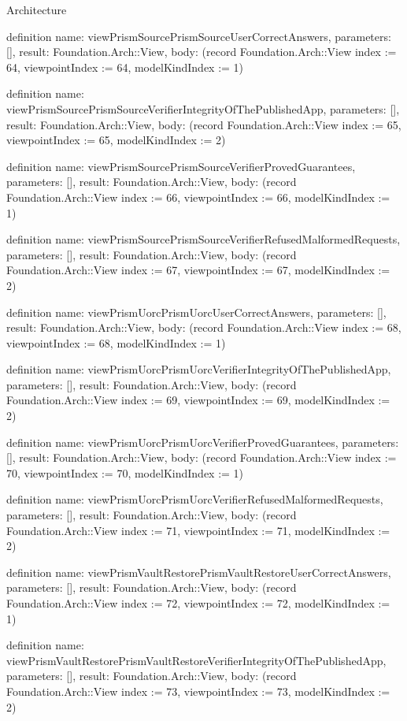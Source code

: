 \begin{lexlean}{Architecture}
\begin{semanticmodule}
definition{
  name: viewPrismSourcePrismSourceUserCorrectAnswers,
  parameters: [],
  result: Foundation.Arch::View,
  body: (record Foundation.Arch::View {index := 64, viewpointIndex := 64, modelKindIndex := 1})
}

definition{
  name: viewPrismSourcePrismSourceVerifierIntegrityOfThePublishedApp,
  parameters: [],
  result: Foundation.Arch::View,
  body: (record Foundation.Arch::View {index := 65, viewpointIndex := 65, modelKindIndex := 2})
}

definition{
  name: viewPrismSourcePrismSourceVerifierProvedGuarantees,
  parameters: [],
  result: Foundation.Arch::View,
  body: (record Foundation.Arch::View {index := 66, viewpointIndex := 66, modelKindIndex := 1})
}

definition{
  name: viewPrismSourcePrismSourceVerifierRefusedMalformedRequests,
  parameters: [],
  result: Foundation.Arch::View,
  body: (record Foundation.Arch::View {index := 67, viewpointIndex := 67, modelKindIndex := 2})
}

definition{
  name: viewPrismUorcPrismUorcUserCorrectAnswers,
  parameters: [],
  result: Foundation.Arch::View,
  body: (record Foundation.Arch::View {index := 68, viewpointIndex := 68, modelKindIndex := 1})
}

definition{
  name: viewPrismUorcPrismUorcVerifierIntegrityOfThePublishedApp,
  parameters: [],
  result: Foundation.Arch::View,
  body: (record Foundation.Arch::View {index := 69, viewpointIndex := 69, modelKindIndex := 2})
}

definition{
  name: viewPrismUorcPrismUorcVerifierProvedGuarantees,
  parameters: [],
  result: Foundation.Arch::View,
  body: (record Foundation.Arch::View {index := 70, viewpointIndex := 70, modelKindIndex := 1})
}

definition{
  name: viewPrismUorcPrismUorcVerifierRefusedMalformedRequests,
  parameters: [],
  result: Foundation.Arch::View,
  body: (record Foundation.Arch::View {index := 71, viewpointIndex := 71, modelKindIndex := 2})
}

definition{
  name: viewPrismVaultRestorePrismVaultRestoreUserCorrectAnswers,
  parameters: [],
  result: Foundation.Arch::View,
  body: (record Foundation.Arch::View {index := 72, viewpointIndex := 72, modelKindIndex := 1})
}

definition{
  name: viewPrismVaultRestorePrismVaultRestoreVerifierIntegrityOfThePublishedApp,
  parameters: [],
  result: Foundation.Arch::View,
  body: (record Foundation.Arch::View {index := 73, viewpointIndex := 73, modelKindIndex := 2})
}


\end{semanticmodule}
\end{lexlean}

